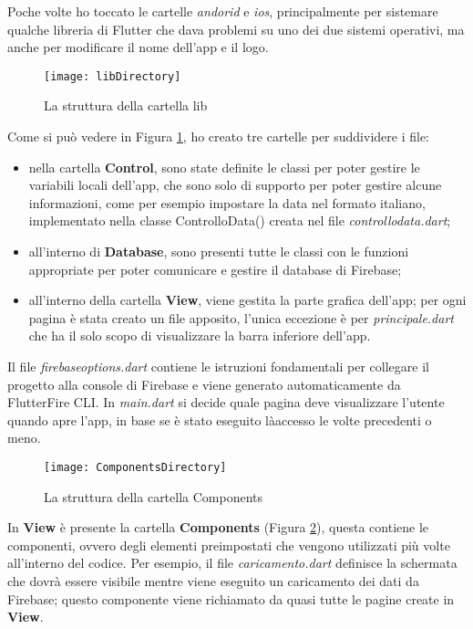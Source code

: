 Poche volte ho toccato le cartelle \emph{andorid} e \emph{ios}, principalmente per sistemare qualche libreria di Flutter che dava problemi su uno dei due sistemi operativi, ma anche per modificare il nome dell'app e il logo. 
\newpage
\begin{figure}[!h] 
    \centering 
    \texttt{[image: libDirectory]} 
    \caption{La struttura della cartella lib}
    \label{fig:directory-lib}
\end{figure}
Come si può vedere in Figura \ref{fig:directory-lib}, ho creato tre cartelle per suddividere i file:
\begin{itemize}
    \item nella cartella \textbf{Control}, sono state definite le classi per poter gestire le variabili locali dell'app, che sono solo di supporto per poter gestire alcune informazioni, come per esempio impostare la data nel formato italiano, implementato nella classe ControlloData() creata nel file \emph{controllo\textunderscore  data.dart};
    \item all'interno di \textbf{Database}, sono presenti tutte le classi con le funzioni appropriate per poter comunicare e gestire il database di Firebase;
    \item all'interno della cartella \textbf{View}, viene gestita la parte grafica dell'app; per ogni pagina è stata creato un file apposito, l'unica eccezione è per \emph{principale.dart} che ha il solo scopo di visualizzare la barra inferiore dell'app.
\end{itemize}
Il file \emph{firebase\textunderscore options.dart} contiene le istruzioni fondamentali per collegare il progetto alla console di Firebase e viene generato automaticamente da FlutterFire CLI.\newline
\newline
In \emph{main.dart} si decide quale pagina deve visualizzare l'utente quando apre l'app, in base se è stato eseguito làaccesso le volte precedenti o meno.
\newpage
\begin{figure}[!h] 
    \centering 
    \texttt{[image: ComponentsDirectory]} 
    \caption{La struttura della cartella Components}
    \label{fig:directory-components}
\end{figure}
In \textbf{View} è presente la cartella \textbf{Components} (Figura \ref{fig:directory-components}), questa contiene le componenti, ovvero degli elementi preimpostati che vengono utilizzati più volte all'interno del codice.\newline
Per esempio, il file \emph{caricamento.dart} definisce la schermata che dovrà essere visibile mentre viene eseguito un caricamento dei dati da Firebase; questo componente viene richiamato da quasi tutte le pagine create in \textbf{View}.

